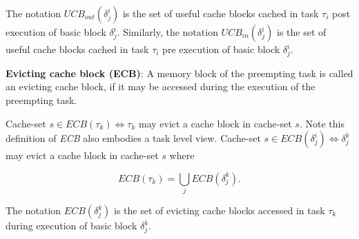 \noindent The notation \begin{math}\textit{UCB}_{out}(\delta_{j}^{i})\end{math} is the set of useful cache blocks cached in task \begin{math}\tau_{i}\end{math} post execution of basic block \begin{math}\delta_{j}^{i}\end{math}.  Similarly, the notation \begin{math}\textit{UCB}_{in}(\delta_{j}^{i})\end{math} is the set of useful cache blocks cached in task \begin{math}\tau_{i}\end{math} pre execution of basic block \begin{math}\delta_{j}^{i}\end{math}.

\begin{definition}
\textbf{Evicting cache block (ECB)}: A memory block of the preempting task is called an evicting cache block, if it may be accessed during the execution of the preempting task.
\end{definition}

\noindent Cache-set \begin{math}s \in \textit{ECB}(\tau_{k}) \Leftrightarrow \tau_{k}\end{math} may evict a cache block in cache-set $s$.  Note this definition of \textit{ECB} also embodies a task level view.  Cache-set \begin{math}s \in \textit{ECB}(\delta_{j}^{i}) \Leftrightarrow \delta_{j}^{k}\end{math} may evict a cache block in cache-set $s$ where

\begin{equation}\label{eqn:ecb-task}
    \textit{ECB}(\tau_{k}) = \bigcup_{j} \textit{ECB}(\delta_{j}^{k}).
\end{equation}

\noindent The notation \begin{math}\textit{ECB}(\delta_{j}^{k})\end{math} is the set of evicting cache blocks accessed in task \begin{math}\tau_{k}\end{math} during execution of basic block \begin{math}\delta_{j}^{k}\end{math}.  

